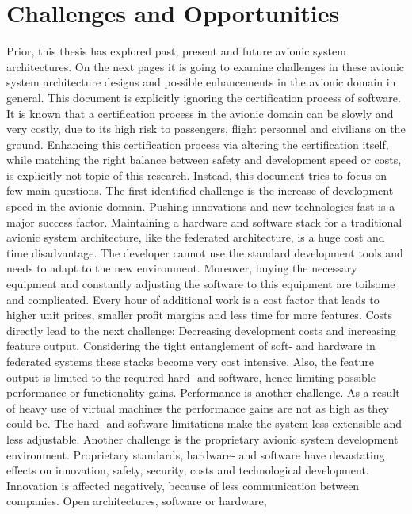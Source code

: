 \documentclass[titlepage]{report}
\begin{document}
\section{Challenges and Opportunities}\label{section:Challenges_And_Opportunities}
Prior, this thesis has explored past, present and future avionic system architectures. On the next pages it is going to examine
challenges in these avionic system architecture designs and possible enhancements in the avionic domain in general. This document is explicitly ignoring the certification
process of software. It is known that a certification process in the avionic domain can be slowly and very costly, due to its
high risk to passengers, flight personnel and civilians on the ground. Enhancing this certification process via altering the certification itself, while matching the right balance between safety
and development speed or costs, is explicitly not topic of this research. Instead, this document tries to focus on few main questions.
The first identified challenge is the increase of development speed in the avionic domain. Pushing innovations and new technologies fast is a major
success factor. Maintaining a hardware and software stack for a traditional avionic system architecture, like the federated architecture, is a
huge cost and time disadvantage. The developer cannot use the standard development tools and needs to adapt to the new environment. Moreover,
buying the necessary equipment and constantly adjusting the software to this equipment are toilsome and complicated. Every hour of additional
work is a cost factor that leads to higher unit prices, smaller profit margins and less time for more features. Costs directly lead to the next
challenge: Decreasing development costs and increasing feature output. Considering the tight entanglement of soft- and hardware in federated systems
these stacks become very cost intensive. Also, the feature output is limited to the required hard- and software,
hence limiting possible performance or functionality gains. Performance is another challenge. As a result of heavy use of virtual machines the performance
gains are not as high as they could be. The hard- and software limitations make the system less extensible and less adjustable. Another challenge is the
proprietary avionic system development environment. Proprietary standards, hardware- and software have devastating effects on innovation, safety, security,
costs and technological development. Innovation is affected negatively, because of less communication between companies. Open architectures, software or hardware,
\end{document}
